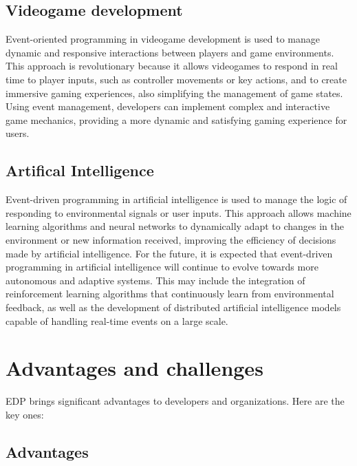 \documentclass[twocolumn]{article}
\begin{document}
\subsection{Videogame development}

Event-oriented programming in videogame development is used to manage dynamic and responsive interactions between players and game environments. 
This approach is revolutionary because it allows videogames to respond in real time to player inputs, such as controller movements or key actions, and to create immersive gaming experiences, also simplifying the management of game states.
Using event management, developers can implement complex and interactive game mechanics, providing a more dynamic and satisfying gaming experience for users.

\subsection{Artifical Intelligence}

Event-driven programming in artificial intelligence is used to manage the logic of responding to environmental signals or user inputs. 
This approach allows machine learning algorithms and neural networks to dynamically adapt to changes in the environment or new information received, improving the efficiency of decisions made by artificial intelligence.
For the future, it is expected that event-driven programming in artificial intelligence will continue to evolve towards more autonomous and adaptive systems. 
This may include the integration of reinforcement learning algorithms that continuously learn from environmental feedback, as well as the development of distributed artificial intelligence models capable of handling real-time events on a large scale.

\section{Advantages and challenges}
\label{sec:prosAndCons}

EDP brings significant advantages to developers and organizations. Here are the key ones:

\subsection*{Advantages}
\end{document}
